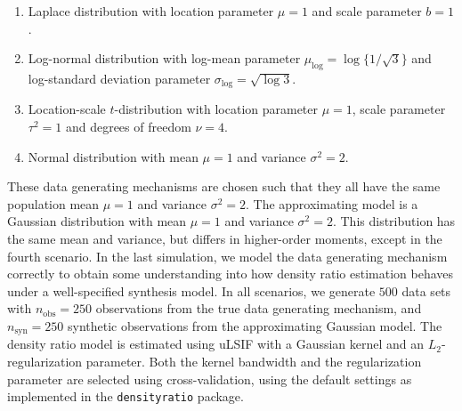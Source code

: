 \documentclass[
]{article}
\providecommand{\tightlist}{%
  \setlength{\itemsep}{0pt}\setlength{\parskip}{0pt}}\usepackage{longtable,booktabs,array}
\newcommand{\nobs}{n_{\text{obs}}}
\newcommand{\nsyn}{n_{\text{syn}}}
\begin{document}
\begin{enumerate}
\def\labelenumi{\arabic{enumi}.}
\tightlist
\item
  Laplace distribution with location parameter \(\mu = 1\) and scale
  parameter \(b = 1\).
\item
  Log-normal distribution with log-mean parameter
  \(\mu_{\text{log}} = \log \{1/\sqrt{3} \}\) and log-standard deviation
  parameter \(\sigma_\text{log} = \sqrt{\log 3}\).
\item
  Location-scale \(t\)-distribution with location parameter \(\mu = 1\),
  scale parameter \(\tau^2 = 1\) and degrees of freedom \(\nu = 4\).
\item
  Normal distribution with mean \(\mu = 1\) and variance
  \(\sigma^2 = 2\).
\end{enumerate}

These data generating mechanisms are chosen such that they all have the
same population mean \(\mu = 1\) and variance \(\sigma^2 = 2\). The
approximating model is a Gaussian distribution with mean \(\mu = 1\) and
variance \(\sigma^2 = 2\). This distribution has the same mean and
variance, but differs in higher-order moments, except in the fourth
scenario. In the last simulation, we model the data generating mechanism
correctly to obtain some understanding into how density ratio estimation
behaves under a well-specified synthesis model. In all scenarios, we
generate \(500\) data sets with \(\nobs = 250\) observations from the
true data generating mechanism, and \(\nsyn = 250\) synthetic
observations from the approximating Gaussian model. The density ratio
model is estimated using uLSIF with a Gaussian kernel and an
\(L_2\)-regularization parameter. Both the kernel bandwidth and the
regularization parameter are selected using cross-validation, using the
default settings as implemented in the \texttt{densityratio} package.
\end{document}
